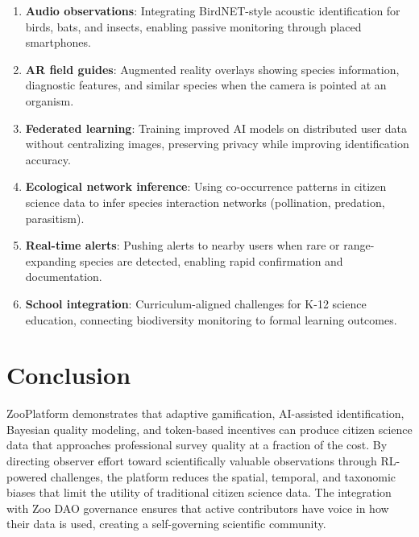 \documentclass[11pt,a4paper]{article}
\begin{document}
\begin{enumerate}
  \item \textbf{Audio observations}: Integrating BirdNET-style acoustic
    identification for birds, bats, and insects, enabling passive
    monitoring through placed smartphones.

  \item \textbf{AR field guides}: Augmented reality overlays showing
    species information, diagnostic features, and similar species when
    the camera is pointed at an organism.

  \item \textbf{Federated learning}: Training improved AI models on
    distributed user data without centralizing images, preserving
    privacy while improving identification accuracy.

  \item \textbf{Ecological network inference}: Using co-occurrence
    patterns in citizen science data to infer species interaction
    networks (pollination, predation, parasitism).

  \item \textbf{Real-time alerts}: Pushing alerts to nearby users
    when rare or range-expanding species are detected, enabling rapid
    confirmation and documentation.

  \item \textbf{School integration}: Curriculum-aligned challenges for
    K-12 science education, connecting biodiversity monitoring to
    formal learning outcomes.
\end{enumerate}


\section{Conclusion}
\label{sec:conclusion}

ZooPlatform demonstrates that adaptive gamification, AI-assisted
identification, Bayesian quality modeling, and token-based incentives
can produce citizen science data that approaches professional survey
quality at a fraction of the cost. By directing observer effort toward
scientifically valuable observations through RL-powered challenges,
the platform reduces the spatial, temporal, and taxonomic biases that
limit the utility of traditional citizen science data. The integration
with Zoo DAO governance ensures that active contributors have voice in
how their data is used, creating a self-governing scientific community.
\end{document}
